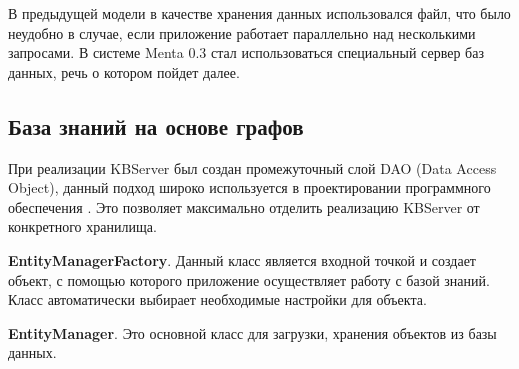 В предыдущей модели в качестве хранения данных использовался файл, что было неудобно в случае, если приложение работает параллельно над несколькими запросами. В системе Menta 0.3 стал использоваться специальный сервер баз данных, речь о котором пойдет далее.

\subsection{База знаний на основе графов}
При реализации KBServer был создан промежуточный слой DAO (Data Access Object), данный подход широко используется в проектировании программного обеспечения \cite{THREELAYERARCH}. Это позволяет максимально отделить реализацию KBServer от конкретного хранилища. \par 

\textbf{EntityManagerFactory}. Данный класс является входной точкой и создает объект, с помощью которого приложение осуществляет работу с базой знаний. Класс автоматически выбирает необходимые настройки для объекта. \par

\textbf{EntityManager}. Это основной класс для загрузки, хранения объектов из базы данных.\par

